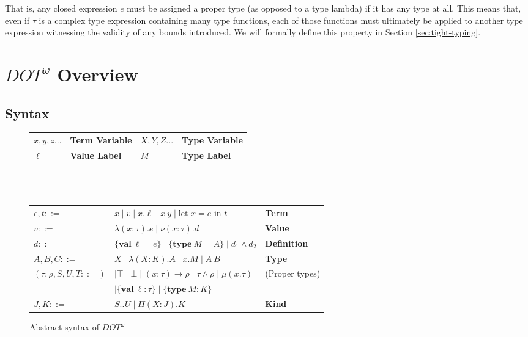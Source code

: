 \documentclass[a4paper, 10pt]{article}
\newcommand{\DOTw}{\ensuremath{DOT^\omega}}
\newcommand{\interval}[3][]{#2 .._{#1} #3}
\newcommand{\KDepArr}[3]{\Pi(#1:#2).#3}
\newcommand{\TDepArr}[3]{(#1:#2) \rightarrow #3}
\newcommand{\objtyp}[3]{\{ \textbf{#1}\ #2 : #3 \}}
\newcommand{\objval}[3]{\{ \textbf{#1}\ #2 = #3 \}}
\newcommand{\termlet}[3]{\text{let }#1 = #2\text{ in }#3}
\begin{document}
That is, any closed expression $e$ must be assigned a proper type (as opposed
to a type lambda) if it has any type at all. This means that, even if $\tau$ is
a complex type expression containing many type functions, each of those
functions must ultimately be applied to another type expression witnessing the
validity of any bounds introduced. We will formally define this property in
Section \ref{sec:tight-typing}.
\fi

\section{$\DOTw$ Overview}

\subsection{Syntax}

\begin{figure}[ht]
  \centering
  \begin{tabularx}{\linewidth}{XXXX}
    $x,y,z$... & \textbf{Term Variable} & $X,Y,Z$... & \textbf{Type Variable}\\
    $\ell$ & \textbf{Value Label} & $M$ & \textbf{Type Label} \\
  \end{tabularx}
  \hfill \\
  \hfill \\
  \begin{tabularx}{\linewidth}{XlX}
    $e,t ::=$ &
    $x \mid v \mid x.\ell \mid x\ y \mid \termlet{x}{e}{t}$
      & \textbf{Term} \\
    $v ::=$ & $\lambda(x:\tau).e \mid \nu(x:\tau).d$ & \textbf{Value} \\
    $d ::=$ & $\objval{val}{\ell}{e} \mid \objval{type}{M}{A} \mid
      d_1 \land d_2$ & \textbf{Definition} \\
    $A,B,C ::=$ &
    $X \mid \lambda(X:K).A \mid x.M \mid A\ B$ & \textbf{Type} \\
    $(\tau, \rho, S, U, T ::=)$ &
      $\mid \top \mid \bot \mid \TDepArr{x}{\tau}{\rho}
      \mid \tau \land \rho \mid \mu(x.\tau)$ & (Proper types) \\
    & $\mid \objtyp{val}{\ell}{\tau} \mid \objtyp{type}{M}{K}$ & \\
    $J,K ::=$ & $\interval{S}{U} \mid \KDepArr{X}{J}{K}$ & \textbf{Kind} \\
  \end{tabularx}
  \caption{Abstract syntax of $\DOTw{}$}
\end{figure}
\end{document}

